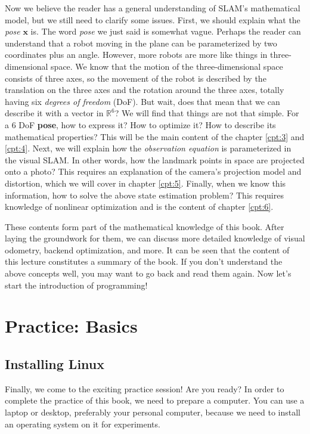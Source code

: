 Now we believe the reader has a general understanding of SLAM's mathematical model, but we still need to clarify some issues. First, we should explain what the \textit{pose} $\mathbf{x}$ is. The word \textit{pose} we just said is somewhat vague. Perhaps the reader can understand that a robot moving in the plane can be parameterized by two coordinates plus an angle. However, more robots are more like things in three-dimensional space. We know that the motion of the three-dimensional space consists of three axes, so the movement of the robot is described by the translation on the three axes and the rotation around the three axes, totally having six \textit{degrees of freedom} (DoF). But wait, does that mean that we can describe it with a vector in $\mathbb{R}^6$? We will find that things are not that simple. For a 6 DoF \textbf{pose}, how to express it? How to optimize it? How to describe its mathematical properties?  This will be the main content of the chapter \ref{cpt:3} and \ref{cpt:4}. Next, we will explain how the \textit{observation equation} is parameterized in the visual SLAM. In other words, how the landmark points in space are projected onto a photo? This requires an explanation of the camera's projection model and distortion, which we will cover in chapter \ref{cpt:5}. Finally, when we know this information, how to solve the above state estimation problem? This requires knowledge of nonlinear optimization and is the content of chapter \ref{cpt:6}.
    
These contents form part of the mathematical knowledge of this book. After laying the groundwork for them, we can discuss more detailed knowledge of visual odometry, backend optimization, and more. It can be seen that the content of this lecture constitutes a summary of the book. If you don't understand the above concepts well, you may want to go back and read them again. Now let's start the introduction of programming!

\section{Practice: Basics}
\subsection{Installing Linux}
Finally, we come to the exciting practice session! Are you ready? In order to complete the practice of this book, we need to prepare a computer. You can use a laptop or desktop, preferably your personal computer, because we need to install an operating system on it for experiments.

